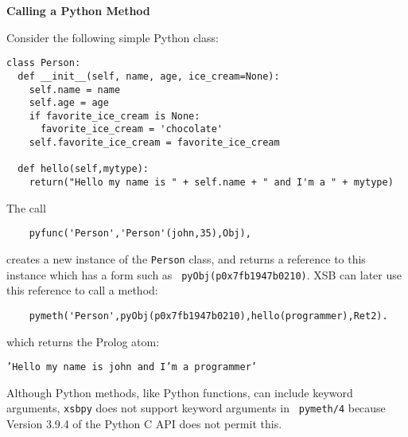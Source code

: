 \begin{example} \rm {\bf Calling a Python Method} \label{xsbpy-examp:method}

\noindent
Consider the following simple Python class:

\begin{verbatim}
class Person:
  def __init__(self, name, age, ice_cream=None):
    self.name = name
    self.age = age
    if favorite_ice_cream is None:
      favorite_ice_cream = 'chocolate'
    self.favorite_ice_cream = favorite_ice_cream

  def hello(self,mytype):
    return("Hello my name is " + self.name + " and I'm a " + mytype)
\end{verbatim}

\noindent
The call

\begin{verbatim}
    pyfunc('Person','Person'(john,35),Obj),
\end{verbatim}
\noindent
creates a new instance of the {\tt Person} class, and returns a
reference to this instance which has a form such as {\tt
  pyObj(p0x7fb1947b0210)}.  XSB can later use this reference to call a
method:
\begin{verbatim}
    pymeth('Person',pyObj(p0x7fb1947b0210),hello(programmer),Ret2).
\end{verbatim}

\noindent
which returns the Prolog atom:

{\tt 'Hello my name is john and I'm a programmer'}

\noindent
Although Python methods, like Python functions, can include keyword
arguments, {\tt xsbpy} does not support keyword arguments in {\tt
  pymeth/4} because Version 3.9.4 of the Python C API does not permit
this.
\end{example}


